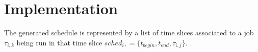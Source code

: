 







\section{Implementation}
\label{sec:implementation}

The generated schedule is represented by a list of time slices associated to a job $\tau_{i,k}$ being run in that time slice $sched_i, = \{t_{begin}, t_{end}, \tau_{i,j}\}$.